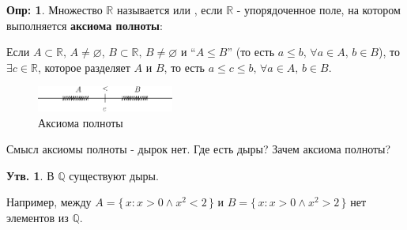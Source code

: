 \documentclass[12pt]{article}
\theoremstyle{definition}
\newtheorem{defn}{Опр:}
\newtheorem{prop}{Утв.}
\begin{document}
\begin{defn}
	Множество $\mathbb{R}$ называется  или , если $\mathbb{R}$ - упорядоченное поле, на котором выполняется \textbf{аксиома полноты}:
	
	Если $A \subset \mathbb{R}, \, A \neq \varnothing$, $B \subset \mathbb{R}, \, B \neq \varnothing$ и ``$A \leq B$'' (то есть $a \leq b, \, \forall a \in A,\, b \in B$), то $\exists c \in \mathbb{R}$, которое разделяет $A$ и $B$, то есть $a \leq c \leq b, \, \forall a \in A,\, b \in B$.
\end{defn}

\begin{figure}[H]
	\centering
	\includegraphics[width=0.40\textwidth]{6_1.eps}
	\caption{Аксиома полноты}
	\label{fig:6_1}
\end{figure}
Смысл аксиомы полноты - дырок нет. Где есть дыры? Зачем аксиома полноты?
\begin{prop}
	В $\mathbb{Q}$ существуют дыры.
\end{prop}

Например, между $A = \{\,x : x > 0 \wedge x^2 < 2\,\}$ и $B = \{\,x : x > 0 \wedge x^2 > 2\,\}$ нет элементов из $\mathbb{Q}$.
\end{document}
